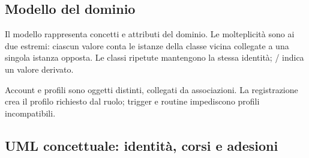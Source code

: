 \documentclass[11pt,a4paper]{article}
\begin{document}
\clearpage\begin{landscape}
\section{Modello del dominio}
Il modello rappresenta concetti e attributi del dominio. Le molteplicità sono ai due estremi: ciascun valore conta le istanze della classe vicina collegate a una singola istanza opposta. Le classi ripetute mantengono la stessa identità; / indica un valore derivato.

Account e profili sono oggetti distinti, collegati da associazioni. La registrazione crea il profilo richiesto dal ruolo; trigger e routine impediscono profili incompatibili.


\subsection{UML concettuale: identità, corsi e adesioni}
\begin{center}\begin{minipage}{\linewidth}
\centering
{}
\end{minipage}
\end{center}
\end{landscape}
\end{document}
